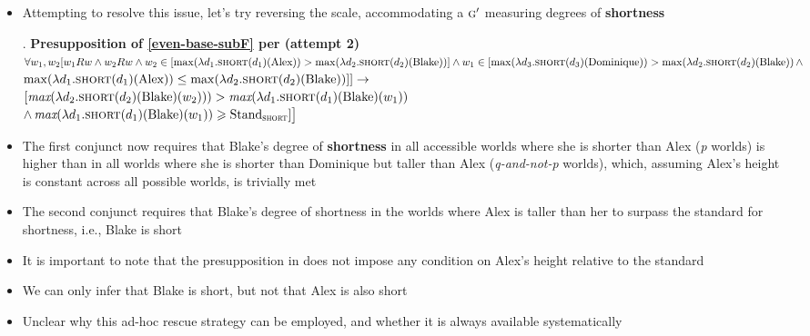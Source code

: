 \documentclass[11pt,letterpaper]{scrartcl}
\begin{document}
\begin{itemize}
    \item Attempting to resolve this issue, let's try reversing the scale, accommodating a $\textsc{g}'$ measuring degrees of \textbf{shortness}
    
    \ex. \textbf{Presupposition of \ref{even-base-subF} per \cite{greenberg_revised_2018} (attempt 2)} \\ 
    $\forall w_1, w_2 [w_1Rw \land w_2Rw \land w_2 \in [\max(\lambda d_1.\textsc{short}(d_1)(\text{Alex})) > \max(\lambda d_2.\textsc{short}(d_2)(\text{Blake}))]  
    \land 
    w_1 \in [\max(\lambda d_3.\textsc{short}(d_3)(\text{Dominique})) >  \max(\lambda d_2.\textsc{short}(d_2)(\text{Blake})) \, \land$ \\  \hspace*{\fill} $\max(\lambda d_1.\textsc{short}(d_1)(\text{Alex})) \leq \max(\lambda d_2.\textsc{short}(d_2)(\text{Blake}))]] \rightarrow
    $ \\
    $[\textit{max}(\lambda d_2.\textsc{short}(d_2)(\text{Blake})(w_2))) > \textit{max}(\lambda d_1.\textsc{short}(d_1)(\text{Blake})(w_1))$ \\ 
    $\land \, \textit{max}(\lambda d_1.\textsc{short}(d_1)(\text{Blake})(w_1)) \geqslant \text{Stand}_{\textsc{short}} ] \big]$
    
    \item The first conjunct now requires that Blake's degree of \textbf{shortness} in all accessible worlds where she is shorter than Alex (\textit{p} worlds) is higher than in all worlds where she is shorter than Dominique but taller than Alex (\textit{q-and-not-p} worlds), which, assuming Alex's height is constant across all possible worlds, is trivially met
    
    \item The second conjunct requires that Blake's degree of shortness in the worlds where Alex is taller than her to surpass the standard for shortness, i.e., Blake is short
    
    \item It is important to note that the presupposition in \Last does not impose any condition on Alex's height relative to the standard
    
    \item We can only infer that Blake is short, but not that Alex is also short
    
    \item Unclear why this ad-hoc rescue strategy can be employed, and whether it is always available systematically
    

\end{itemize}
\end{document}
